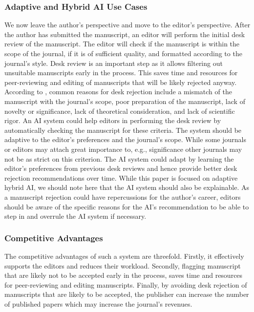 \subsubsection*{Adaptive and Hybrid AI Use Cases}

We now leave the author's perspective and move to the editor's perspective. After the author has submitted the manuscript, an editor
will perform the initial desk review of the manuscript. The editor will check if the manuscript is within the scope of the journal, if
it is of sufficient quality, and formatted according to the journal's style. Desk review is an important step as it allows filtering out
unsuitable manuscripts early in the process. This saves time and resources for peer-reviewing and editing of manuscripts that will be
likely rejected anyway. According to \citet{dwivediEditorialHowDevelop2022}, common reasons for desk rejection include a mismatch of the 
manuscript with the journal's scope, poor preparation of the manuscript, lack of novelty or significance, lack of theoretical
consideration, and lack of scientific rigor. An AI system could help editors in performing the desk review by automatically checking the
manuscript for these criteria. The system should be adaptive to the editor's preferences and the journal's scope. While some journals or
editors may attach great importance to, e.g., significance other journals may not be as strict on this criterion. The AI system could
adapt by learning the editor's preferences from previous desk reviews and hence provide better desk rejection recommendations over time.
While this paper is focused on adaptive hybrid AI, we should note here that the AI system should also be explainable. As a manuscript 
rejection could have repercussions for the author's career, editors should be aware of the specific reasons for the AI's recommendation 
to be able to step in and overrule the AI system if necessary.

\subsubsection*{Competitive Advantages} 

The competitive advantages of such a system are threefold. Firstly, it effectively supports the editors and reduces their workload.
Secondly, flagging manuscript that are likely not to be accepted early in the process, saves time and resources for peer-reviewing and
editing manuscripts. Finally, by avoiding desk rejection of manuscripts that are likely to be accepted, the publisher can increase the
number of published papers which may increase the journal's revenues.

